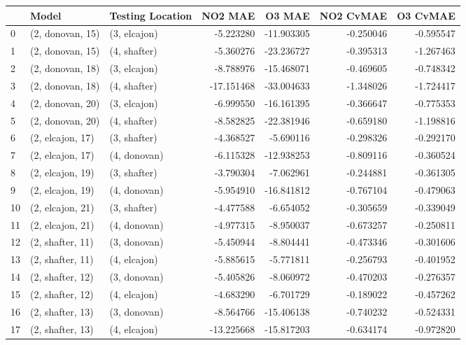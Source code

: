 \begin{tabular}{lllrrrr}
\toprule
{} &             Model & Testing Location &    NO2 MAE &     O3 MAE &  NO2 CvMAE &  O3 CvMAE \\
\midrule
0  &  (2, donovan, 15) &     (3, elcajon) &  -5.223280 & -11.903305 &  -0.250046 & -0.595547 \\
1  &  (2, donovan, 15) &     (4, shafter) &  -5.360276 & -23.236727 &  -0.395313 & -1.267463 \\
2  &  (2, donovan, 18) &     (3, elcajon) &  -8.788976 & -15.468071 &  -0.469605 & -0.748342 \\
3  &  (2, donovan, 18) &     (4, shafter) & -17.151468 & -33.004633 &  -1.348026 & -1.724417 \\
4  &  (2, donovan, 20) &     (3, elcajon) &  -6.999550 & -16.161395 &  -0.366647 & -0.775353 \\
5  &  (2, donovan, 20) &     (4, shafter) &  -8.582825 & -22.381946 &  -0.659180 & -1.198816 \\
6  &  (2, elcajon, 17) &     (3, shafter) &  -4.368527 &  -5.690116 &  -0.298326 & -0.292170 \\
7  &  (2, elcajon, 17) &     (4, donovan) &  -6.115328 & -12.938253 &  -0.809116 & -0.360524 \\
8  &  (2, elcajon, 19) &     (3, shafter) &  -3.790304 &  -7.062961 &  -0.244881 & -0.361305 \\
9  &  (2, elcajon, 19) &     (4, donovan) &  -5.954910 & -16.841812 &  -0.767104 & -0.479063 \\
10 &  (2, elcajon, 21) &     (3, shafter) &  -4.477588 &  -6.654052 &  -0.305659 & -0.339049 \\
11 &  (2, elcajon, 21) &     (4, donovan) &  -4.977315 &  -8.950037 &  -0.673257 & -0.250811 \\
12 &  (2, shafter, 11) &     (3, donovan) &  -5.450944 &  -8.804441 &  -0.473346 & -0.301606 \\
13 &  (2, shafter, 11) &     (4, elcajon) &  -5.885615 &  -5.771811 &  -0.256793 & -0.401952 \\
14 &  (2, shafter, 12) &     (3, donovan) &  -5.405826 &  -8.060972 &  -0.470203 & -0.276357 \\
15 &  (2, shafter, 12) &     (4, elcajon) &  -4.683290 &  -6.701729 &  -0.189022 & -0.457262 \\
16 &  (2, shafter, 13) &     (3, donovan) &  -8.564766 & -15.406138 &  -0.740232 & -0.524331 \\
17 &  (2, shafter, 13) &     (4, elcajon) & -13.225668 & -15.817203 &  -0.634174 & -0.972820 \\

\end{tabular}
